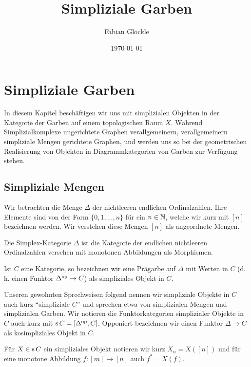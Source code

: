 



\title{Simpliziale Garben}
\author{Fabian Glöckle}
\date{\today}

\chapter{Simpliziale Garben}

In diesem Kapitel beschäftigen wir uns mit simplizialen Objekten in
der Kategorie der Garben auf einem topologischen Raum $X$. Während
Simplizialkomplexe ungerichtete Graphen verallgemeinern,
verallgemeinern simpliziale Mengen gerichtete Graphen, und werden uns
so bei der geometrischen Realisierung von Objekten in
Diagrammkategorien von Garben zur Verfügung stehen.

\section{Simpliziale Mengen}

Wir betrachten die Menge $\Delta$ der nichtleeren endlichen
Ordinalzahlen. Ihre Elemente sind von der Form $\{0, 1, \dots, n\}$
für ein $n \in \mathbb{N}$, welche wir kurz mit $[n]$ bezeichnen werden. Wir
verstehen diese Mengen $[n]$ als angeordnete Mengen.

\begin{defn}
  Die Simplex-Kategorie $\Delta$ ist die Kategorie der endlichen
  nichtleeren Ordinalzahlen versehen mit monotonen Abbildungen als
  Morphismen.

  Ist $C$ eine Kategorie, so bezeichnen wir eine Prägarbe auf $\Delta$
  mit Werten in $C$ (d. h. einen Funktor $\Delta^\mathrm{op} \to C$) als
  simpliziales Objekt in $C$.
\end{defn}

Unseren gewohnten Sprechweisen folgend nennen wir simpliziale Objekte
in $C$ auch kurz ``simpliziale $C$'' und sprechen etwa von
simplizialen Mengen und simplizialen Garben. Wir notieren die
Funktorkategorien simplizialer Objekte in $C$ auch kurz mit $\operatorname{s} C =
[\Delta^\mathrm{op}, C]$. Opponiert bezeichnen wir einen Funktor $\Delta \to C$
als kosimpliziales Objekt in $C$.

Für $X \in \operatorname{s} C$ ein simpliziales Objekt notieren wir kurz $X_n =
X([n])$ und für eine monotone Abbildung $f: [m] \to [n]$ auch $f^* =
X(f)$.

